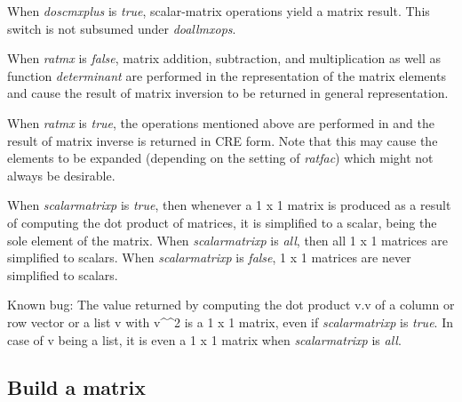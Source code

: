 \documentclass[../Maxima_Workbook.tex]{subfiles}
\begin{document}
\lz When \emph{doscmxplus} is \emph{true}, scalar-matrix operations yield a matrix result. This switch is not subsumed under \emph{doallmxops}.

\lzz {} \qquad {} \hfill {}

\lz {} \qquad {} \hfill {}

\lz {} \qquad {} \hfill {}

\lzz {} \qquad {} \hfill {}

\lz When \emph{ratmx} is \emph{false}, matrix addition, subtraction, and multiplication as well as function \emph{determinant} are performed in the representation of the matrix elements and cause the result of matrix inversion to be returned in general representation.

\lz When \emph{ratmx} is \emph{true}, the operations mentioned above are performed in  and the result of matrix inverse is returned in CRE form. Note that this may cause the elements to be expanded (depending on the setting of \emph{ratfac}) which might not always be desirable.

\lzz {} \qquad {} \hfill {}

\lz When \emph{scalarmatrixp} is \emph{true}, then whenever a 1 x 1 matrix is produced as a result of computing the dot product of matrices, it is simplified to a scalar, being the sole element of the matrix. When \emph{scalarmatrixp} is \emph{all}, then all 1 x 1 matrices are simplified to scalars. When \emph{scalarmatrixp} is \emph{false}, 1 x 1 matrices are never simplified to scalars.

\lz Known bug: The value returned by computing the dot product v.v of a column or row vector or a list v with v\textasciicircum \textasciicircum 2 is a 1 x 1 matrix, even if \emph{scalarmatrixp} is \emph{true}. In case of v being a list, it is even a 1 x 1 matrix when \emph{scalarmatrixp} is \emph{all}.

\subsection{Build a matrix}
\end{document}
